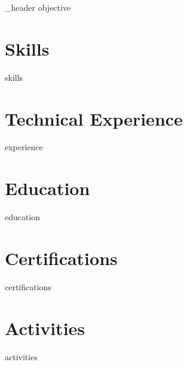 \documentclass[letter,10pt]{article}
\author{Takasur Azeem} %
\begin{document}
{_header}
{objective}

\section{Skills}
{skills}

\section{Technical Experience}
{experience}

\section{Education}
{education}

\section{Certifications}
{certifications}


\section{Activities}
{activities}
\end{document}
